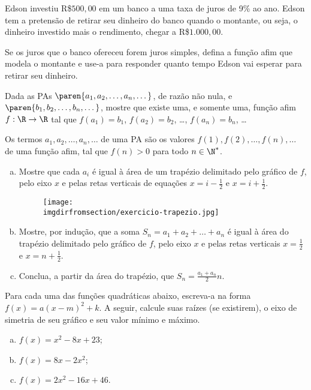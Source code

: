 \begin{exercise}
  Edson investiu R\$$500{,}00$ em um banco a uma taxa de juros de 9\% ao ano. Edson tem a pretensão de retirar seu dinheiro do banco quando o montante, ou seja, o dinheiro investido mais o rendimento, chegar a R\$$1.000{,}00$.

Se os juros que o banco ofereceu forem juros simples, defina a função afim que modela o montante e use-a para responder quanto tempo Edson vai esperar para retirar seu dinheiro.
\end{exercise}

\begin{exercise}
    Dada as PAs $\paren{a_1, a_2, \dots, a_n, \dots}$, de razão não
nula, e $\paren{b_1, b_2, \dots, b_n, \dots}$, mostre que existe
uma, e somente uma, função afim $f: \R \to \R$ tal que $f(a_1) =
b_1$, $f(a_2) = b_2$, \dots , $f(a_n) = b_n$, \dots
\end{exercise}

\begin{exercise}
  Os termos $a_1, a_2, \dots, a_n, \dots$ de uma PA são os valores
  $f(1), f(2), \dots, f(n), \dots$ de uma função afim, tal que $f(n)
  >0$ para todo $n \in \N^\ast$.

  \begin{enumerate}[a)]
    \item Mostre que cada $a_i$ é igual à área de um trapézio
    delimitado pelo gráfico de $f$, pelo eixo $x$ e pelas retas
    verticais de equações $x=i - \frac 1 2 $ e $x = i + \frac 1 2$.
    
    \begin{figure}[H]
      \centering
      \texttt{[image: \\imgdirfromsection/exercicio-trapezio.jpg]}
      \label{fig:exercicio-trapezio}
    \end{figure}

    \item Mostre, por indução, que a soma $S_n = a_1+a_2+ \dots + a_n$ é igual à
    área do trapézio delimitado pelo gráfico de $f$, pelo eixo $x$ e
    pelas retas verticais $x= \frac 1 2$ e $x = n + \frac 1 2 $.
    \item Conclua, a partir da área do trapézio, que $S_n = \frac{a_1+a_n} 2 n$.
  \end{enumerate}
\end{exercise}

\begin{exercise}
    Para cada uma das funções quadráticas abaixo, escreva-a na forma
$f(x)=a(x-m)^2+k$. A seguir, calcule suas raízes (se existirem), o
eixo de simetria de seu gráfico e seu valor mínimo e máximo.
%
\begin{enumerate}[a)]
  \item $f(x) = x^2 -8x +23$;
  \item $f(x) = 8x - 2x^2$;
  \item $f(x) = 2x^2 - 16x +46$.
\end{enumerate}
\end{exercise}

